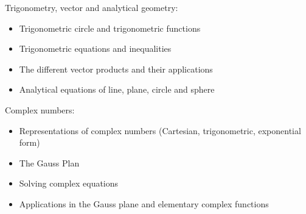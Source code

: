 Trigonometry, vector and analytical geometry:
\begin{itemize}
    \item Trigonometric circle and trigonometric functions
    \item Trigonometric equations and inequalities
    \item The different vector products and their applications
    \item Analytical equations of line, plane, circle and sphere
\end{itemize}
Complex numbers:
\begin{itemize}
    \item Representations of complex numbers (Cartesian, trigonometric, exponential form)
    \item The Gauss Plan
    \item Solving complex equations
    \item Applications in the Gauss plane and elementary complex functions
\end{itemize}